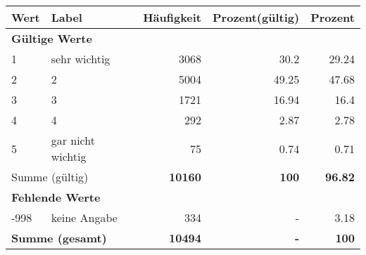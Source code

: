      \begin{longtable}{lXrrr}
     \toprule
     \textbf{Wert} & \textbf{Label} & \textbf{Häufigkeit} & \textbf{Prozent(gültig)} & \textbf{Prozent} \\
     \endhead
     \midrule
     \multicolumn{5}{l}{\textbf{Gültige Werte}}\\

     1 &
     \multicolumn{1}{X}{ sehr wichtig   } &


       \num{3068} &
       \num[round-mode=places,round-precision=2]{30,2} &
         \num[round-mode=places,round-precision=2]{29,24} \\

     2 &
     \multicolumn{1}{X}{ 2   } &


       \num{5004} &
       \num[round-mode=places,round-precision=2]{49,25} &
         \num[round-mode=places,round-precision=2]{47,68} \\

     3 &
     \multicolumn{1}{X}{ 3   } &


       \num{1721} &
       \num[round-mode=places,round-precision=2]{16,94} &
         \num[round-mode=places,round-precision=2]{16,4} \\

     4 &
     \multicolumn{1}{X}{ 4   } &


       \num{292} &
       \num[round-mode=places,round-precision=2]{2,87} &
         \num[round-mode=places,round-precision=2]{2,78} \\

     5 &
     \multicolumn{1}{X}{ gar nicht wichtig   } &


       \num{75} &
       \num[round-mode=places,round-precision=2]{0,74} &
         \num[round-mode=places,round-precision=2]{0,71} \\
     \midrule
     \multicolumn{2}{l}{Summe (gültig)} &
       \textbf{\num{10160}} &
     \textbf{100} &
       \textbf{\num[round-mode=places,round-precision=2]{96,82}} \\
     \multicolumn{5}{l}{\textbf{Fehlende Werte}}\\
       -998 &
       keine Angabe &
         \num{334} &
        - &
         \num[round-mode=places,round-precision=2]{3,18} \\
     \midrule
     \multicolumn{2}{l}{\textbf{Summe (gesamt)}} &
          \textbf{\num{10494}} &
        \textbf{-} &
        \textbf{100} \\
     \bottomrule
     \end{longtable}
     
